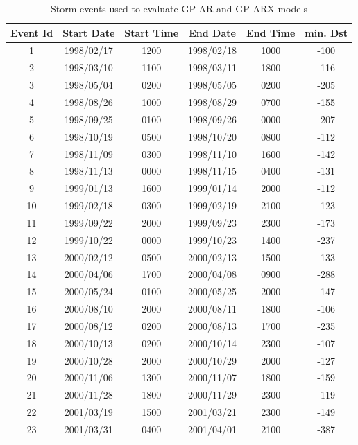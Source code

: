 \documentclass{article}
\begin{document}
\begin{table}[h]
  \fontsize{6}{7.5}\selectfont
  \centering
  \caption{Storm events used to evaluate GP-AR and GP-ARX models}
  \label{table:teststorms}
  \begin{tabular}{cccccc}
    \hline
    Event Id & Start Date & Start Time & End Date & End Time & min. Dst \\ \hline
    1 & 1998/02/17 & 1200 & 1998/02/18 & 1000 & -100 \\
    2 & 1998/03/10 & 1100 & 1998/03/11 & 1800 & -116 \\
    3 & 1998/05/04 & 0200 & 1998/05/05 & 0200 & -205 \\
    4 & 1998/08/26 & 1000 & 1998/08/29 & 0700 & -155 \\
    5 & 1998/09/25 & 0100 & 1998/09/26 & 0000 & -207 \\
    6 & 1998/10/19 & 0500 & 1998/10/20 & 0800 & -112 \\
    7 & 1998/11/09 & 0300 & 1998/11/10 & 1600 & -142 \\
    8 & 1998/11/13 & 0000 & 1998/11/15 & 0400 & -131 \\
    9 & 1999/01/13 & 1600 & 1999/01/14 & 2000 & -112 \\
    10 & 1999/02/18 & 0300 & 1999/02/19 & 2100 & -123 \\
    11 & 1999/09/22 & 2000 & 1999/09/23 & 2300 & -173 \\
    12 & 1999/10/22 & 0000 & 1999/10/23 & 1400 & -237 \\
    13 & 2000/02/12 & 0500 & 2000/02/13 & 1500 & -133 \\
    14 & 2000/04/06 & 1700 & 2000/04/08 & 0900 & -288 \\
    15 & 2000/05/24 & 0100 & 2000/05/25 & 2000 & -147 \\
    16 & 2000/08/10 & 2000 & 2000/08/11 & 1800 & -106 \\
    17 & 2000/08/12 & 0200 & 2000/08/13 & 1700 & -235 \\
    18 & 2000/10/13 & 0200 & 2000/10/14 & 2300 & -107 \\
    19 & 2000/10/28 & 2000 & 2000/10/29 & 2000 & -127 \\
    20 & 2000/11/06 & 1300 & 2000/11/07 & 1800 & -159 \\
    21 & 2000/11/28 & 1800 & 2000/11/29 & 2300 & -119 \\
    22 & 2001/03/19 & 1500 & 2001/03/21 & 2300 & -149 \\
    23 & 2001/03/31 & 0400 & 2001/04/01 & 2100 & -387 \\

\end{tabular}
\end{table}
\end{document}
